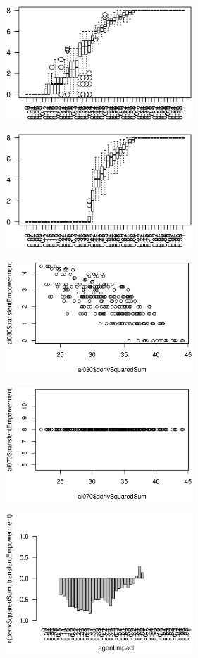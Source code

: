 \documentclass[conference]{IEEEtran}
\begin{document}
\rule{0pt}{0pt}

\centerline{\includegraphics[width=7cm]{n08_chain_small_emp.eps}}

\centerline{\includegraphics[width=7cm]{n08_chain_small_empsust.eps}}

\centerline{\includegraphics[width=7cm]{n08_chain_small_corr_dss_emp_ai030.eps}}

\centerline{\includegraphics[width=7cm]{n08_chain_small_corr_dss_emp_ai070.eps}}

\centerline{\includegraphics[width=7cm]{n08_chain_small_corr_dss_emp.eps}}
\end{document}

